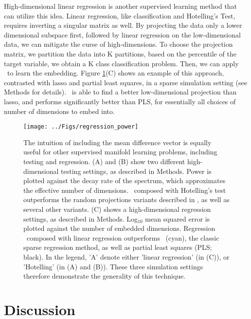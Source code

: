 \documentclass[10pt]{article}
\begin{document}
High-dimensional linear regression is another supervised learning method that can utilize this idea. Linear regression, like classification and Hotelling's Test, requires inverting a singular matrix as well.  By projecting the data only a lower dimensional subspace first, followed by linear regression on the low-dimensional data, we can mitigate the curse of high-dimensions.  To choose the projection matrix, we partition the data into K partitions, based on the percentile of the target variable, we obtain a K class classification problem.  Then, we can apply \Lol~to learn the embedding.  Figure \ref{f:generalizations}(C) shows an example of this approach, contrasted with lasso and partial least squares, in a sparse simulation setting (see Methods for details). \Lol~is able to find a better low-dimensional projection than lasso, and performs significantly better than PLS, for essentially all choices of number of dimensions to embed into.




\begin{figure}
\centering
\texttt{[image: ../Figs/regression\_power]}
\caption{
The intuition of including the mean difference vector is equally useful for other supervised manifold learning problems, including testing and regression.
(A) and (B) show two different high-dimensional testing settings, as described in Methods.  Power is plotted against the decay rate of the spectrum, which approximates the effective number of dimensions.  \Lol~composed with Hotelling's test outperforms the random projections variants described in \cite{Lopes2011a}, as well as several other variants.
(C) shows a high-dimensional regression settings, as described in Methods.  Log$_{10}$ mean squared error is plotted against the number of embedded dimensions.  
Regression \Lol~composed with linear regression outperforms ~(cyan), the classic sparse regression method, as well as partial least squares (PLS; black).
In the legend, 'A' denote either 'linear regression' (in (C)), or 'Hotelling' (in (A) and (B)).
These three simulation settings therefore demonstrate the generality of this technique.
}
\label{f:generalizations}
\end{figure}


\section*{Discussion}
\end{document}

